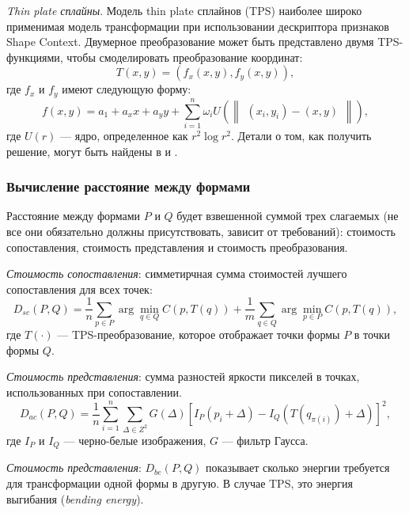 \emph{Thin plate сплайны}. Модель thin plate сплайнов (TPS) наиболее широко применимая модель трансформации при использовании дескриптора признаков Shape Context. Двумерное преобразование может быть представлено двумя TPS-функциями, чтобы смоделировать преобразование координат:
\begin{displaymath}
  T(x,y) = \left (f_x(x,y),f_y(x,y)\right ),
\end{displaymath}
где $f_x$ и $f_y$ имеют следующую форму:
\begin{displaymath}
  f(x,y) = a_1 + a_xx + a_yy + \sum_{i=1}^n\omega_iU\left (\begin{Vmatrix}
    (x_i,y_i) - (x,y) \end{Vmatrix} \right ),
\end{displaymath}
где $U(r)$ --- ядро, определенное как $r^2\log r^2$. Детали о том, как получить решение, могут быть найдены в \cite{powell95} и \cite{duchon}.

\subsubsection{Вычисление расстояние между формами}
Расстояние между формами $P$ и $Q$ будет взвешенной суммой трех слагаемых (не все они обязательно должны присутствовать, зависит от требований): стоимость сопоставления, стоимость представления и стоимость преобразования.

\emph{Стоимость сопоставления}: симметирчная сумма стоимостей лучшего сопоставления для всех точек:
\begin{displaymath}
  D_{sc}(P,Q) = \frac{1}{n}\sum_{p \in P} \arg \underset{q \in Q}{\min} C(p,T(q)) + \frac{1}{m}\sum_{q \in Q} \arg \underset{p \in P}{\min} C(p,T(q)),
\end{displaymath}
где $T(\cdot)$ --- TPS-преобразование, которое отображает точки формы $P$ в точки формы $Q$.

\emph{Стоимость представления}: сумма разностей яркости пикселей в точках, использованных при сопоставлении.
\begin{displaymath}
  D_{ac}(P,Q) = \frac{1}{n}\sum_{i=1}^n\sum_{\Delta \in Z^2} G(\Delta)\left [I_P(p_i + \Delta) - I_Q(T(q_{\pi(i)}) + \Delta)\right ]^2,
\end{displaymath}
где $I_P$ и $I_Q$ --- черно-белые изображения, $G$ --- фильтр Гаусса.

\emph{Стоимость представления}: $D_{be}(P,Q)$ показывает сколько энергии требуется для трансформации одной формы в другую. В случае TPS, это энергия выгибания (\emph{bending energy}).


